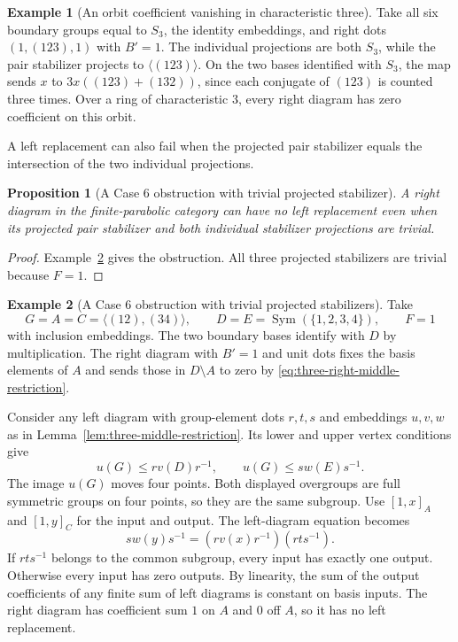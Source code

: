 \documentclass[11pt,a4paper]{article}
\numberwithin{equation}{section}
\newtheorem{proposition}[theorem]{Proposition}
\theoremstyle{definition}
\newtheorem{example}{Example}[section]
\begin{document}
\begin{example}[An orbit coefficient vanishing in characteristic three]\label{ex:case-six-characteristic-three}
Take all six boundary groups equal to
\(S_3\), the identity embeddings, and right dots \((1,(123),1)\)
with \(B'=1\). The individual projections are both \(S_3\),
while the pair stabilizer projects to \(\langle(123)\rangle\).
On the two bases identified with \(S_3\), the map sends
\(x\) to \(3x((123)+(132))\), since each conjugate of \((123)\)
is counted three times. Over a ring of characteristic \(3\), every
right diagram has zero coefficient on this orbit.
\end{example}

A left replacement can also fail when the projected pair stabilizer
equals the intersection of the two individual projections.

\begin{proposition}[A Case 6 obstruction with trivial projected stabilizer]\label{prop:parabolic-mixed-three}
A right diagram in the finite-parabolic category can have no left
replacement even when its projected pair stabilizer and both
individual stabilizer projections are trivial.
\end{proposition}

\begin{proof}


Example~\ref{ex:case-six-trivial-stabilizers} gives the obstruction. All three projected stabilizers are trivial because \(F=1\).
\end{proof}

\begin{example}[A Case 6 obstruction with trivial projected stabilizers]\label{ex:case-six-trivial-stabilizers}
Take
\[
 G=A=C=\langle(12),(34)\rangle,\qquad
 D=E=\operatorname{Sym}(\{1,2,3,4\}),\qquad F=1
\]
with inclusion embeddings. The two boundary bases identify with
\(D\) by multiplication. The right diagram with \(B'=1\) and unit
dots fixes the basis elements of \(A\) and sends those in
\(D\setminus A\) to zero by \eqref{eq:three-right-middle-restriction}.

Consider any left diagram with group-element dots \(r,t,s\) and
embeddings \(u,v,w\) as in Lemma~\ref{lem:three-middle-restriction}.
Its lower and upper vertex conditions give
\[
 u(G)\le r v(D)r^{-1},\qquad u(G)\le s w(E)s^{-1}.
\]
The image \(u(G)\) moves four points. Both displayed overgroups are
full symmetric groups on four points, so they are the same subgroup.
Use \([1,x]_A\) and \([1,y]_C\) for the input and output.
The left-diagram equation becomes
\[
 s w(y)s^{-1}=(r v(x)r^{-1})(rts^{-1}).
\]
If \(rts^{-1}\) belongs to the common subgroup, every input has
exactly one output. Otherwise every input has zero outputs.
By linearity, the sum of the output coefficients of any finite
sum of left diagrams is constant on basis inputs. The right
diagram has coefficient sum \(1\) on \(A\) and \(0\) off \(A\),
so it has no left replacement.

\end{example}
\end{document}
